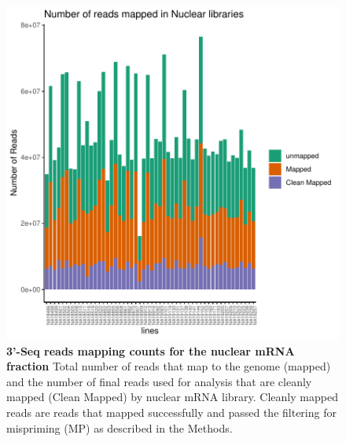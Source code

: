 \begin{figure}[!htb]
\centering
\includegraphics[width=5in]{img/ch02/Fig1_figuresupplement10.pdf}
\caption[3'-Seq reads mapping counts for the nuclear mRNA fraction ]{\textbf{3'-Seq reads mapping counts for the nuclear mRNA fraction } Total number of reads that map to the genome (mapped) and the number of final reads used for analysis that are cleanly mapped (Clean Mapped) by nuclear mRNA library. Cleanly mapped reads are reads that mapped successfully and passed the filtering for mispriming (MP) as described in the Methods.}
\label{fig:NucMapCount}
\end{figure}
\clearpage

